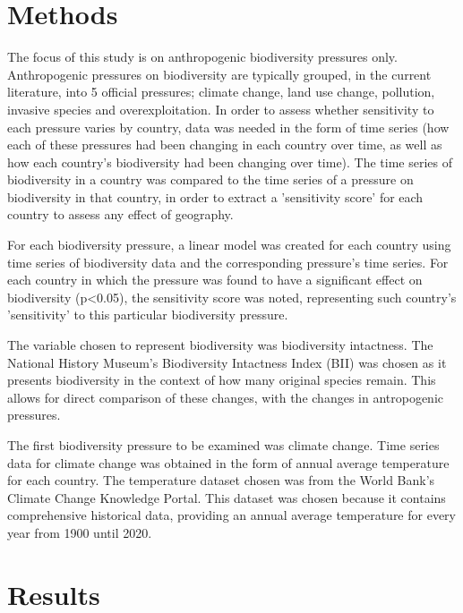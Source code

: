 \documentclass[11pt, a4paper, titlepage]{article}
\begin{document}
    \section*{Methods}

	The focus of this study is on anthropogenic biodiversity pressures only. Anthropogenic pressures on biodiversity are typically grouped, in the current literature, into 5 official pressures; climate change, land use change, pollution, invasive species and overexploitation. In order to assess whether sensitivity to each pressure varies by country, data was needed in the form of time series (how each of these pressures had been changing in each country over time, as well as how each country's biodiversity had been changing over time). The time series of biodiversity in a country was compared to the time series of a pressure on biodiversity in that country, in order to extract a 'sensitivity score' for each country to assess any effect of geography.
	
	For each biodiversity pressure, a linear model was created for each country using time series of biodiversity data and the corresponding pressure's time series. For each country in which the pressure was found to have a significant effect on biodiversity (p<0.05), the sensitivity score was noted, representing such country's 'sensitivity' to this particular biodiversity pressure. 
	
	The variable chosen to represent biodiversity was biodiversity intactness. The National History Museum's Biodiversity Intactness Index (BII) was chosen as it presents biodiversity in the context of how many original species remain. This allows for direct comparison of these changes, with the changes in antropogenic pressures. 
	
	The first biodiversity pressure to be examined was climate change. Time series data for climate change was obtained in the form of annual average temperature for each country. The temperature dataset chosen was from the World Bank's Climate Change Knowledge Portal. This dataset was chosen because it contains comprehensive historical data, providing an annual average temperature for every year from 1900 until 2020. 
	
	 
	
	
	

	\clearpage

	 \section*{Results}
\end{document}
